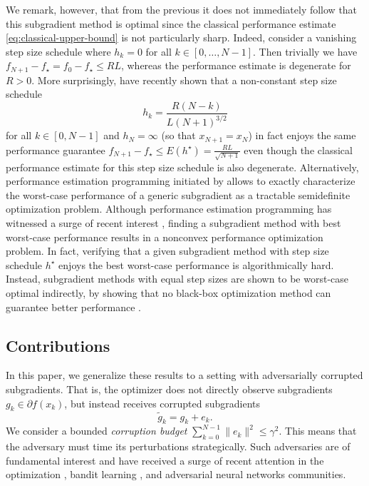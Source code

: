 \documentclass{article}
\begin{document}
We remark, however, that from the previous it does not immediately follow that this subgradient method is optimal since the classical performance estimate \eqref{eq:classical-upper-bound} is not particularly sharp.
Indeed, consider a vanishing step size schedule where $h_k=0$ for all $k\in [0, \dots, N-1]$. Then trivially we have $f_{N+1} - f_\star=f_0 -f_\star\leq R L$, whereas the performance estimate is degenerate for $R>0$.
More surprisingly,  \cite{zamani2023exact} have recently shown that a non-constant step size schedule
\begin{equation}
  \label{eq:zamani-stepsize}
  h_k = \frac{R(N-k)}{L(N+1)^{3/2}}
\end{equation}
for all $k\in [0, N-1]$ and $h_N=\infty$ (so that $x_{N+1}=x_N$) in fact enjoys the same performance guarantee $f_{N+1}-f_\star\leq E(h^\star)= \tfrac{RL}{\sqrt{N+1}}$ even though the classical performance estimate for this step size schedule is also degenerate.
Alternatively, performance estimation programming initiated by \citet{drori_performance_2014} allows to exactly characterize the worst-case performance of a generic subgradient as a tractable semidefinite optimization problem.
Although performance estimation programming has witnessed a surge of recent interest \citep{taylor_smooth_2017, das_gupta_branch-and-bound_2024}, finding a subgradient method with best worst-case performance results in a nonconvex performance optimization problem. In fact, verifying that a given subgradient method with step size schedule $h^\star$ enjoys the best worst-case performance is algorithmically hard.
Instead, subgradient methods with equal step sizes are shown to be worst-case optimal indirectly, by showing that no black-box optimization method can guarantee better performance \citep{Drori_Teboulle_2016}.

\subsection{Contributions}

In this paper, we generalize these results to a setting with adversarially corrupted subgradients. That is, the optimizer does not directly observe subgradients $g_k\in\partial f(x_k)$, but instead receives corrupted subgradients
\[
  \tilde g_k = g_k+e_k.
\]
We consider a bounded \emph{corruption budget} $\sum_{k=0}^{N-1}\|e_k\|^2 \leq \gamma^2$.
This means that the adversary must time its perturbations strategically. Such adversaries are of fundamental interest and have received a surge of recent attention in the optimization \citep{chang_gradient_2022}, bandit learning \citep{lykouris2018stochastic}, and adversarial neural networks \citep{wang2021robust} communities.
\end{document}
